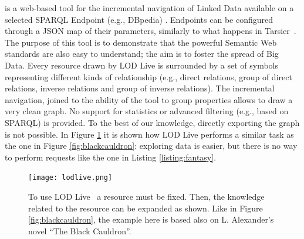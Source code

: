 \begin{description}[wide, labelindent=0pt]
\item[LOD Live] is a web-based tool for the incremental navigation of Linked Data available on a selected SPARQL Endpoint (e.g., DBpedia) \cite{camarda2012lodlive}. Endpoints can be configured through a JSON map of their parameters, similarly to what happens in Tarsier~\cite{viola2018interactive}. The purpose of this tool is to demonstrate that the powerful Semantic Web standards are also easy to understand; the aim is to foster the spread of Big Data. Every resource drawn by LOD Live is surrounded by a set of symbols representing different kinds of relationship (e.g., direct relations, group of direct relations, inverse relations and group of inverse relations). The incremental navigation, joined to the ability of the tool to group properties allows to draw a very clean graph. No support for statistics or advanced filtering (e.g., based on SPARQL) is provided. To the best of our knowledge, directly exporting the graph is not possible. In Figure \ref{fig:lodlive} it is shown how LOD Live performs a similar task as the one in Figure \ref{fig:blackcauldron}: exploring data is easier, but there is no way to perform requests like the one in Listing \ref{listing:fantasy}.
\begin{figure}
\centering
\texttt{[image: lodlive.png]}
\caption{To use LOD Live~\cite{camarda2012lodlive} a resource must be fixed. Then, the knowledge related to the resource can be expanded as shown. Like in Figure \ref{fig:blackcauldron}, the example here is based also on L. Alexander's novel ``The Black Cauldron''.}
\label{fig:lodlive}
\end{figure}


\end{description}
